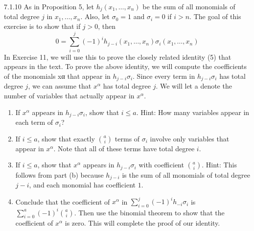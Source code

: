 \documentclass[twoside]{article}
\begin{document}
\begin{ejercicio}{7.1.10}
As in Proposition 5, let $h_j(x_1 , \dots , x_n)$ be the sum of all monomials of total degree $j$ in $x_1 ,\dots , x_n$.
Also, let $σ_0 = 1$ and $σ_i = 0$ if $i > n$.
The goal of this exercise is to show that if $j > 0$, then
\[ 0 = \sum_{i=0}^j (-1)^i h_{j-i}(x_1,\dots,x_n) \sigma_i(x_1,\dots,x_n) \]
In Exercise 11, we will use this to prove the closely related identity (5) that appears in the text. To prove the above identity, we will compute the coefficients of the monomials xα that appear in $h_{j-i} σ_i$.
Since every term in $h_{j-i} σ_i$ has total degree $j$, we can assume that $x^α$ has total degree $j$.
We will let a denote the number of variables that actually appear in $x^α$.
\begin{enumerate}
\item If $x^α$ appears in $h_{j-i} σ_i$, show that $i ≤ a$. Hint: How many variables appear in each term of $σ_i$?
\item If $i ≤ a$, show that exactly $\binom{a}{i}$ terms of $σ_i$ involve only variables that appear in $x^α$.
Note that all of these terms have total degree $i$.
\item If $i ≤ a$, show that $x^α$ appears in $h_{j-i} σ_i$ with coefficient $\binom{a}{i}$.
Hint: This follows from part (b) because $h_{j-i}$ is the sum of all monomials of total degree $j - i$, and each monomial has coefficient $1$.
\item Conclude that the coefficient of $x^α$ in $\sum_{i=0}^j (-1)^i h_{-i}σ_i$ is $\sum_{i=0}^a (-1)^i \binom{a}{i}$.
Then use the binomial theorem to show that the coefficient of $x^α$ is zero.
This will complete the proof of our identity.
\end{enumerate}
\end{ejercicio}

\newpage
\end{document}
